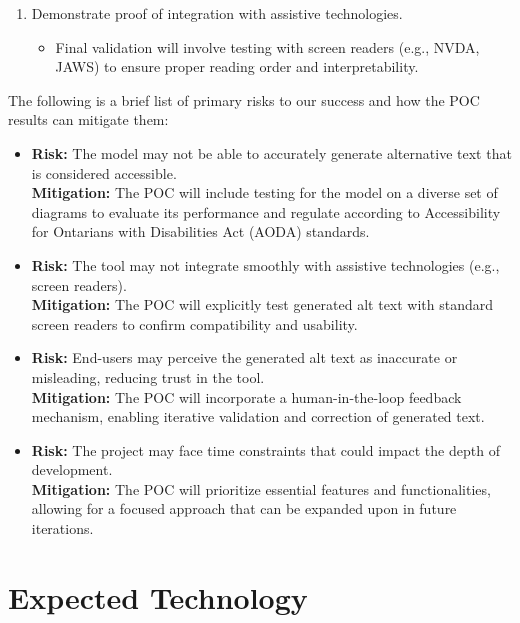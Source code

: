 \documentclass{article}
\begin{document}
\begin{enumerate}
    \item Demonstrate proof of integration with assistive technologies.
    \begin{itemize}
        \item Final validation will involve testing with screen readers (e.g., NVDA, JAWS) to ensure proper reading order and interpretability.
    \end{itemize}
\end{enumerate}

The following is a brief list of primary risks to our success and how the POC results can mitigate them: 
\begin{itemize}
    \item \textbf{Risk:} The model may not be able to accurately generate alternative text that is considered accessible. \\
    \textbf{Mitigation:} The POC will include testing for the model on a diverse set of diagrams to evaluate its performance and regulate according to  Accessibility for Ontarians with Disabilities Act (AODA) standards.
      
    \item \textbf{Risk:} The tool may not integrate smoothly with assistive technologies (e.g., screen readers).  \\
    \textbf{Mitigation:} The POC will explicitly test generated alt text with standard screen readers to confirm compatibility and usability.  

    \item \textbf{Risk:} End-users may perceive the generated alt text as inaccurate or misleading, reducing trust in the tool.  \\
    \textbf{Mitigation:} The POC will incorporate a human-in-the-loop feedback mechanism, enabling iterative validation and correction of generated text.  
    
    \item \textbf{Risk:} The project may face time constraints that could impact the depth of development. \\
    \textbf{Mitigation:} The POC will prioritize essential features and functionalities, allowing for a focused approach that can be expanded upon in future iterations.
\end{itemize}

\section{Expected Technology}
\end{document}
